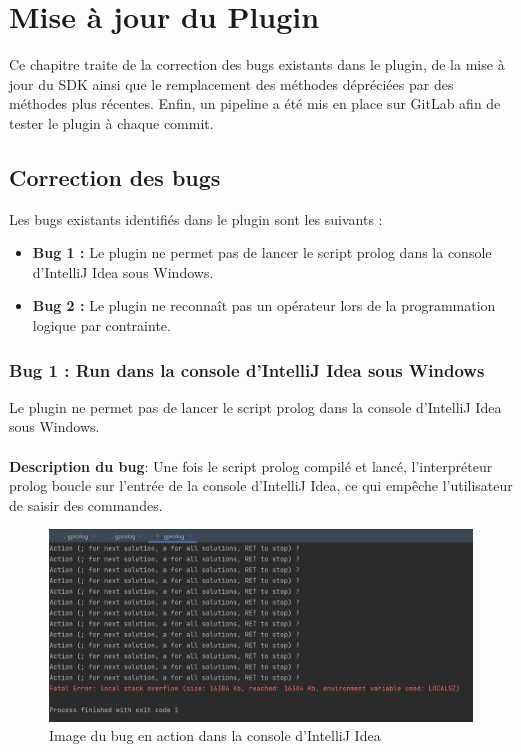 \chapter{Mise à jour du Plugin}



\noindent
Ce chapitre traite de la correction des bugs existants dans le plugin, de la mise à jour du SDK ainsi que le remplacement des méthodes dépréciées par des méthodes plus récentes.
Enfin, un pipeline a été mis en place sur GitLab afin de tester le plugin à chaque commit.


\section{Correction des bugs}
\noindent Les bugs existants identifiés dans le plugin sont les suivants :

\begin{itemize}
    \item \textbf{Bug 1 :} Le plugin ne permet pas de lancer le script prolog dans la console d'IntelliJ Idea sous Windows.
    \item \textbf{Bug 2 :} Le plugin ne reconnaît pas un opérateur lors de la programmation logique par contrainte.
\end{itemize}

\subsection{Bug 1 : Run dans la console d'IntelliJ Idea sous Windows}
\noindent
Le plugin ne permet pas de lancer le script prolog dans la console d'IntelliJ Idea sous Windows.
\\
\\
\textbf{Description du bug}: Une fois le script prolog compilé et lancé, l'interpréteur prolog boucle sur l'entrée de la console d'IntelliJ Idea, ce qui empêche l'utilisateur de saisir des commandes.
\\
\begin{figure}
    \centering
    \includegraphics[scale=.85]{images/Bug_1_Windows.png}
    \caption{Image du bug en action dans la console d'IntelliJ Idea}
    \label{fig:bug_1_windows}
\end{figure}

